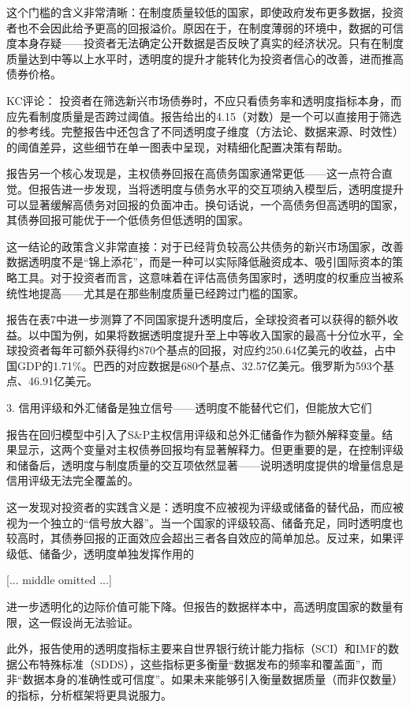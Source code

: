 \documentclass[11pt]{ctexart}
\begin{document}
这个门槛的含义非常清晰：在制度质量较低的国家，即使政府发布更多数据，投资者也不会因此给予更高的回报溢价。原因在于，在制度薄弱的环境中，数据的可信度本身存疑——投资者无法确定公开数据是否反映了真实的经济状况。只有在制度质量达到中等以上水平时，透明度的提升才能转化为投资者信心的改善，进而推高债券价格。

KC评论： 投资者在筛选新兴市场债券时，不应只看债务率和透明度指标本身，而应先看制度质量是否跨过阈值。报告给出的4.15（对数）是一个可以直接用于筛选的参考线。完整报告中还包含了不同透明度子维度（方法论、数据来源、时效性）的阈值差异，这些细节在单一图表中呈现，对精细化配置决策有帮助。

报告另一个核心发现是，主权债券回报在高债务国家通常更低——这一点符合直觉。但报告进一步发现，当将透明度与债务水平的交互项纳入模型后，透明度提升可以显著缓解高债务对回报的负面冲击。换句话说，一个高债务但高透明的国家，其债券回报可能优于一个低债务但低透明的国家。

这一结论的政策含义非常直接：对于已经背负较高公共债务的新兴市场国家，改善数据透明度不是“锦上添花”，而是一种可以实际降低融资成本、吸引国际资本的策略工具。对于投资者而言，这意味着在评估高债务国家时，透明度的权重应当被系统性地提高——尤其是在那些制度质量已经跨过门槛的国家。

报告在表7中进一步测算了不同国家提升透明度后，全球投资者可以获得的额外收益。以中国为例，如果将数据透明度提升至上中等收入国家的最高十分位水平，全球投资者每年可额外获得约870个基点的回报，对应约250.64亿美元的收益，占中国GDP的1.71\%。巴西的对应数据是680个基点、32.57亿美元。俄罗斯为593个基点、46.91亿美元。

3. 信用评级和外汇储备是独立信号——透明度不能替代它们，但能放大它们

报告在回归模型中引入了S\&P主权信用评级和总外汇储备作为额外解释变量。结果显示，这两个变量对主权债券回报均有显著解释力。但更重要的是，在控制评级和储备后，透明度与制度质量的交互项依然显著——说明透明度提供的增量信息是信用评级无法完全覆盖的。

这一发现对投资者的实践含义是：透明度不应被视为评级或储备的替代品，而应被视为一个独立的“信号放大器”。当一个国家的评级较高、储备充足，同时透明度也较高时，其债券回报的正面效应会超出三者各自效应的简单加总。反过来，如果评级低、储备少，透明度单独发挥作用的

[... middle omitted ...]

进一步透明化的边际价值可能下降。但报告的数据样本中，高透明度国家的数量有限，这一假设尚无法验证。

此外，报告使用的透明度指标主要来自世界银行统计能力指标（SCI）和IMF的数据公布特殊标准（SDDS），这些指标更多衡量“数据发布的频率和覆盖面”，而非“数据本身的准确性或可信度”。如果未来能够引入衡量数据质量（而非仅数量）的指标，分析框架将更具说服力。
\end{document}
